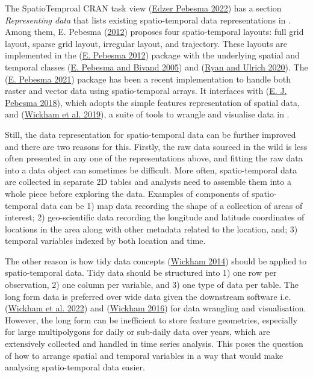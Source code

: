 \documentclass{article}
\begin{document}
The SpatioTemproal CRAN task view (\protect\hyperlink{ref-ctvspatiotemporal}{Edzer Pebesma 2022}) has a section \emph{Representing data} that lists existing spatio-temporal data representations in . Among them, E. Pebesma (\protect\hyperlink{ref-spacetime}{2012}) proposes four spatio-temporal layouts: full grid layout, sparse grid layout, irregular layout, and trajectory. These layouts are implemented in the  (\protect\hyperlink{ref-spacetime}{E. Pebesma 2012}) package with the underlying spatial and temporal classes  (\protect\hyperlink{ref-sp}{E. Pebesma and Bivand 2005}) and  (\protect\hyperlink{ref-xts}{Ryan and Ulrich 2020}). The  (\protect\hyperlink{ref-stars}{E. Pebesma 2021}) package has been a recent implementation to handle both raster and vector data using spatio-temporal arrays. It interfaces with  (\protect\hyperlink{ref-sf}{E. J. Pebesma 2018}), which adopts the simple features representation of spatial data, and  (\protect\hyperlink{ref-tidyverse}{Wickham et al. 2019}), a suite of tools to wrangle and visualise data in .

Still, the data representation for spatio-temporal data can be further improved and there are two reasons for this. Firstly, the raw data sourced in the wild is less often presented in any one of the representations above, and fitting the raw data into a data object can sometimes be difficult. More often, spatio-temporal data are collected in separate 2D tables and analysts need to assemble them into a whole piece before exploring the data. Examples of components of spatio-temporal data can be 1) map data recording the shape of a collection of areas of interest; 2) geo-scientific data recording the longitude and latitude coordinates of locations in the area along with other metadata related to the location, and; 3) temporal variables indexed by both location and time.

The other reason is how tidy data concepts (\protect\hyperlink{ref-tidydata}{Wickham 2014}) should be applied to spatio-temporal data. Tidy data should be structured into 1) one row per observation, 2) one column per variable, and 3) one type of data per table. The long form data is preferred over wide data given the downstream software i.e.~ (\protect\hyperlink{ref-dplyr}{Wickham et al. 2022}) and  (\protect\hyperlink{ref-ggplot2}{Wickham 2016}) for data wrangling and visualisation. However, the long form can be inefficient to store feature geometries, especially for large multipolygons for daily or sub-daily data over years, which are extensively collected and handled in time series analysis. This poses the question of how to arrange spatial and temporal variables in a way that would make analysing spatio-temporal data easier.
\end{document}
